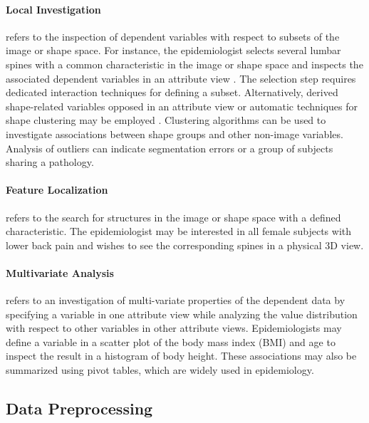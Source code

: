 \documentclass[journal]{style/vgtc} 			          %
\begin{document}
\paragraph{Local Investigation} refers to the inspection of dependent variables with respect to subsets of the image or shape space.
%
For instance, the epidemiologist selects several lumbar spines with a common characteristic in the image or shape space and inspects the associated dependent variables in an attribute view \cite{Hermann2014}.
%
The selection step requires dedicated interaction techniques for defining a subset.
%
Alternatively, derived shape-related variables opposed in an attribute view or automatic techniques for shape clustering may be employed \cite{Klemm2013VMV}.
%
Clustering algorithms can be used to investigate associations between shape groups and other non-image variables.
%
Analysis of outliers can indicate segmentation errors or a group of subjects sharing a pathology.

\paragraph{Feature Localization} refers to the search for structures in the image or shape space with a defined characteristic.
%
The epidemiologist may be interested in all female subjects with lower back pain and wishes to see the corresponding spines in a physical 3D view.

\paragraph{Multivariate Analysis} refers to an investigation of multi-variate properties of the dependent data by specifying a variable in one attribute view while analyzing the value distribution with respect to other variables in other attribute views.
%
Epidemiologists may define a variable in a scatter plot of the body mass index (BMI) and age to inspect the result in a histogram of body height.
%
These associations may also be summarized using pivot tables, which are widely used in epidemiology.

\subsection{Data Preprocessing} \label{Data Preprocessing}
\end{document}
